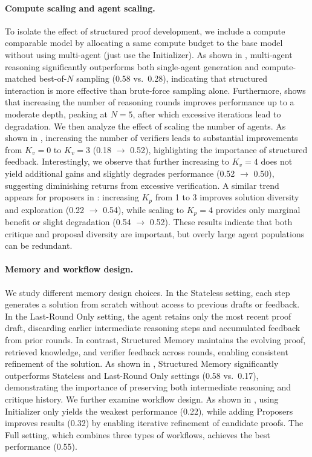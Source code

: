 \documentclass{article}
\begin{document}
\paragraph{Compute scaling and agent scaling.}
To isolate the effect of structured proof development, we include a compute comparable model by allocating a same compute budget to the base model without using multi-agent (just use the Initializer). As shown in , multi-agent reasoning significantly outperforms both single-agent generation and compute-matched best-of-$N$ sampling (0.58 vs.\ 0.28), indicating that structured interaction is more effective than brute-force sampling alone. Furthermore,  shows that increasing the number of reasoning rounds improves performance up to a moderate depth, peaking at $N=5$, after which excessive iterations lead to degradation. We then analyze the effect of scaling the number of agents. As shown in , increasing the number of verifiers leads to substantial improvements from $K_v=0$ to $K_v=3$ (0.18 $\rightarrow$ 0.52), highlighting the importance of structured feedback. Interestingly, we observe that further increasing to $K_v=4$ does not yield additional gains and slightly degrades performance (0.52 $\rightarrow$ 0.50), suggesting diminishing returns from excessive verification. A similar trend appears for proposers in : increasing $K_p$ from 1 to 3 improves solution diversity and exploration (0.22 $\rightarrow$ 0.54), while scaling to $K_p=4$ provides only marginal benefit or slight degradation (0.54 $\rightarrow$ 0.52). These results indicate that both critique and proposal diversity are important, but overly large agent populations can be redundant.
\vspace{-7pt}
\paragraph{Memory and workflow design.}
We study different memory design choices. In the Stateless setting, each step generates a solution from scratch without access to previous drafts or feedback. In the Last-Round Only setting, the agent retains only the most recent proof draft, discarding earlier intermediate reasoning steps and accumulated feedback from prior rounds. In contrast, Structured Memory maintains the evolving proof, retrieved knowledge, and verifier feedback across rounds, enabling consistent refinement of the solution. As shown in , Structured Memory significantly outperforms Stateless and Last-Round Only settings (0.58 vs.\ 0.17), demonstrating the importance of preserving both intermediate reasoning and critique history. We further examine workflow design. As shown in , using Initializer only yields the weakest performance (0.22), while adding Proposers improves results (0.32) by enabling iterative refinement of candidate proofs. The Full setting, which combines three types of workflows, achieves the best performance (0.55).
\end{document}
